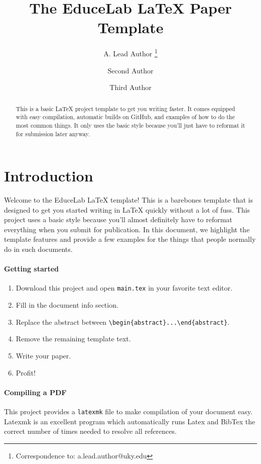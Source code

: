 \documentclass[letterpaper]{article}
\title{The EduceLab \LaTeX{} Paper Template}
\author{A. Lead Author \thanks{Correspondence to: a.lead.author@uky.edu}}
\author{Second Author}
\affil{Dept. of Computer Science, University of Kentucky, Lexington, KY, USA}
\author{Third Author}
\affil{Magdalene College, University of Oxford, Oxford, GB}
\date{}
\begin{document}
\maketitle

\begin{abstract}
This is a basic \LaTeX{} project template to get you writing faster.
It comes equipped with easy compilation, automatic builds on GitHub, and examples of how to do the most common things.
It only uses the basic style because you'll just have to reformat it for submission later anyway.
\end{abstract}

\section{Introduction} \label{sec:intro}
Welcome to the EduceLab \LaTeX{} template!
This is a barebones template that is designed to get you started writing in \LaTeX{} quickly without a lot of fuss.
This project uses a basic style because you'll almost definitely have to reformat everything when you submit for publication.
In this document, we highlight the template features and provide a few examples for the things that people normally do in such documents.

\paragraph{Getting started}
\begin{enumerate}
\item Download this project and open \texttt{main.tex} in your favorite text editor.
\item Fill in the document info section.
\item Replace the abstract between \verb=\begin{abstract}...\end{abstract}=.
\item Remove the remaining template text.
\item Write your paper.
\item Profit!
\end{enumerate}

\paragraph{Compiling a PDF}
This project provides a \texttt{latexmk} file to make compilation of your document easy.
Latexmk is an excellent program which automatically runs Latex and BibTex the correct number of times needed to resolve all references.
\end{document}
